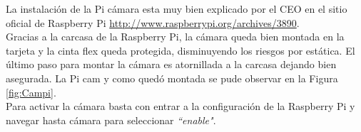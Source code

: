 \documentclass[letterpaper,12pt]{article}
\begin{document}
La instalación de la Pi cámara esta muy bien explicado por el CEO en el sitio oficial de Raspberry Pi \url{http://www.raspberrypi.org/archives/3890}.\\
Gracias a la carcasa de la Raspberry Pi, la cámara queda bien montada en la tarjeta y la cinta flex queda protegida, disminuyendo los riesgos por estática. El último paso para montar la cámara es atornillada a la carcasa dejando bien asegurada. La Pi cam y como quedó montada se pude observar en la Figura \ref{fig:Campi}.\\
Para activar la cámara basta con entrar a la configuración de la Raspberry Pi y navegar hasta cámara para seleccionar \textit{``enable"}. 

\begin{figure}[H]
\centering
{}

\end{figure}
\end{document}
